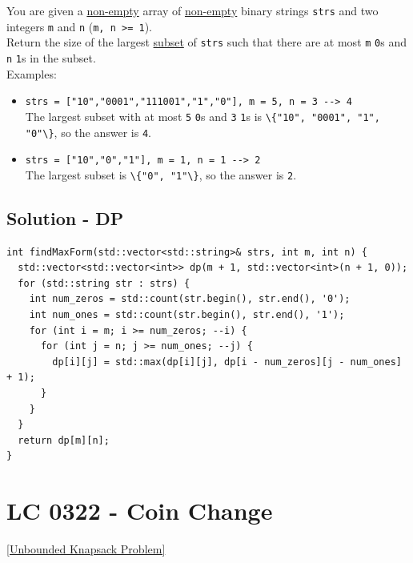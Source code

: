 You are given a \ul{non-empty} array of \ul{non-empty} binary strings {\colorbox{CodeBackground}{\lstinline|strs|}} and two integers {\colorbox{CodeBackground}{\lstinline|m|}} and {\colorbox{CodeBackground}{\lstinline|n|}} ({\colorbox{CodeBackground}{\lstinline|m, n >= 1|}}).\\

Return the size of the largest \ul{subset} of {\colorbox{CodeBackground}{\lstinline|strs|}} such that there are at most {\colorbox{CodeBackground}{\lstinline|m|}} {\colorbox{CodeBackground}{\lstinline|0|}}s and {\colorbox{CodeBackground}{\lstinline|n|}} {\colorbox{CodeBackground}{\lstinline|1|}}s in the subset.\\

Examples:
\begin{itemize}
\item {\colorbox{CodeBackground}{\lstinline|strs = ["10","0001","111001","1","0"], m = 5, n = 3 --> 4|}}\\
The largest subset with at most {\colorbox{CodeBackground}{\lstinline|5|}} {\colorbox{CodeBackground}{\lstinline|0|}}s and {\colorbox{CodeBackground}{\lstinline|3|}} {\colorbox{CodeBackground}{\lstinline|1|}}s is {\colorbox{CodeBackground}{\lstinline|\{"10", "0001", "1", "0"\}|}}, so the answer is {\colorbox{CodeBackground}{\lstinline|4|}}.
\item {\colorbox{CodeBackground}{\lstinline|strs = ["10","0","1"], m = 1, n = 1 --> 2|}}\\
The largest subset is {\colorbox{CodeBackground}{\lstinline|\{"0", "1"\}|}}, so the answer is {\colorbox{CodeBackground}{\lstinline|2|}}.
\end{itemize}

\subsection*{Solution - DP}
\begin{lstlisting}
int findMaxForm(std::vector<std::string>& strs, int m, int n) {
  std::vector<std::vector<int>> dp(m + 1, std::vector<int>(n + 1, 0));
  for (std::string str : strs) {
    int num_zeros = std::count(str.begin(), str.end(), '0');
    int num_ones = std::count(str.begin(), str.end(), '1');
    for (int i = m; i >= num_zeros; --i) {
      for (int j = n; j >= num_ones; --j) {
        dp[i][j] = std::max(dp[i][j], dp[i - num_zeros][j - num_ones] + 1);
      }
    }
  }
  return dp[m][n];
}
\end{lstlisting}

\section{LC 0322 - Coin Change}\label{lc0322}
{\hyperref[subsubsec:unbounded_knapsack_oj_problems]{[Unbounded Knapsack Problem]}} \\

